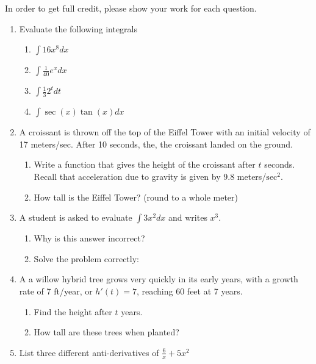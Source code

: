 \documentclass[12pt]{article}
\begin{document}
In order to get full credit, please show your work for each question.
\begin{enumerate}
\item Evaluate the following integrals
\begin{enumerate}
\item $\int 16 x^{8}dx$
\vspace{4cm}
\item $\int \frac{1}{40}e^{x}dx$
\vspace{4cm}
\item $\int \frac{1}{3}2^tdt$
\vspace{4cm}
\item $\int \sec(x)\tan(x)dx$
\vspace{4cm}
\end{enumerate}
\newpage
\item A croissant is thrown off the top of the Eiffel Tower with an initial velocity of 17 meters/sec. After 10 seconds, the, the croissant landed on the ground.  
\begin{enumerate}
\item Write a function that gives the height of the croissant after $t$ seconds. Recall that acceleration due to gravity is given by 9.8 meters/$\text{sec}^2$. 
\vspace{4cm}
\item How tall is the Eiffel Tower? (round to a whole meter)
\vspace{2cm}
\end{enumerate}
\item A student is asked to evaluate $\int 3x^2dx$ and writes $x^3$. 
\begin{enumerate}
\item Why is this answer incorrect?
\vspace{3cm}
\item Solve the problem correctly:
\end{enumerate}
\newpage
\item A a willow hybrid tree grows very quickly in its early years, with a growth rate of 7 ft/year, or $h'(t)=7$, reaching 60 feet at  7 years. 
\begin{enumerate}
\item Find the height after $t$ years. 
\vspace{3cm}
\item How tall are these trees when planted?
\vspace{3cm}
\end{enumerate}
\item List three different anti-derivatives of $\frac{6}{x}+5x^2$

\end{enumerate}
\end{document}
